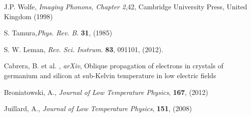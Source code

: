 \documentclass[preprint,12pt]{elsarticle}
\begin{document}
\begin{thebibliography}{99}
J.P. Wolfe, {\it Imaging Phonons, Chapter 2},42, Cambridge University Press, United Kingdom (1998) 

S. Tamura,{\it Phys. Rev. B.} \textbf{31}, (1985)

S. W. Leman, {\it Rev. Sci. Instrum.} \textbf{83}, 091101, (2012).

Cabrera, B. et al. , {\it arXiv},  Oblique propagation of electrons in crystals of germanium and silicon at sub-Kelvin temperature in low electric fields

Broniatowski, A., {\it Journal of Low Temperature Physics}, \textbf{167}, (2012)

Juillard, A., {\it Journal of Low Temperature Physics}, \textbf{151}, (2008) 



\end{thebibliography}






\end{document}

